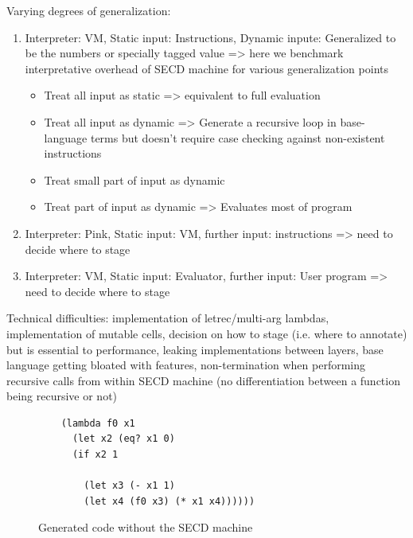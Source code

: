\documentclass[fleqn]{article}
\theoremstyle{definition}
\begin{document}
Varying degrees of generalization:
\begin{enumerate}
	\item Interpreter: VM, Static input: Instructions, Dynamic inpute: Generalized to be the numbers or specially tagged value => here we benchmark interpretative overhead of SECD machine for various generalization points
	\begin{itemize}
		\item Treat all input as static => equivalent to full evaluation
		\item Treat all input as dynamic => Generate a recursive loop in base-language terms but doesn't require case checking against non-existent instructions
		\item Treat small part of input as dynamic
		\item Treat part of input as dynamic => Evaluates most of program
	\end{itemize}
	\item Interpreter: Pink, Static input: VM, further input: instructions => need to decide where to stage
	\item Interpreter: VM, Static input: Evaluator, further input: User program => need to decide where to stage
\end{enumerate}

Technical difficulties: implementation of letrec/multi-arg lambdas, implementation of mutable cells, decision on how to stage (i.e. where to annotate) but is essential to performance, leaking implementations between layers, base language getting bloated with features, non-termination when performing recursive calls from within SECD machine (no differentiation between a function being recursive or not)

\begin{figure}[h]
\centering
\begin{verbatim}
	(lambda f0 x1
	  (let x2 (eq? x1 0)
	  (if x2 1
	
		(let x3 (- x1 1)
		(let x4 (f0 x3) (* x1 x4))))))
\end{verbatim}
\caption{Generated code without the SECD machine}
\label{lst:pink_factorial}
\end{figure}
\end{document}
